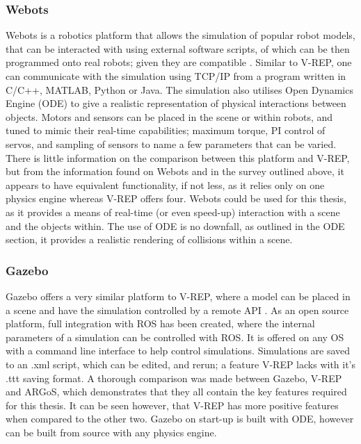 \documentclass[12pt,openany,a4paper]{book}
\begin{document}
\subsubsection{Webots}
Webots is a robotics platform that allows the simulation of popular robot models, that can be interacted with using external software scripts, of which can be then programmed onto real robots; given they are compatible \cite{webotsArticle}. Similar to V-REP, one can communicate with the simulation using TCP/IP from a program written in C/C++, MATLAB, Python or Java. The simulation also utilises Open Dynamics Engine (ODE) to give a realistic representation of physical interactions between objects. Motors and sensors can be placed in the scene or within robots, and tuned to mimic their real-time capabilities; maximum torque, PI control of servos, and sampling of sensors to name a few parameters that can be varied. There is little information on the comparison between this platform and V-REP, but from the information found on Webots and in the survey outlined above, it appears to have equivalent functionality, if not less, as it relies only on one physics engine whereas V-REP offers four.
Webots could be used for this thesis, as it provides a means of real-time (or even speed-up) interaction with a scene and the objects within. The use of ODE is no downfall, as outlined in the ODE section, it provides a realistic rendering of collisions within a scene.

\subsubsection{Gazebo}
Gazebo offers a very similar platform to V-REP, where a model can be placed in a scene and have the simulation controlled by a remote API \cite{comparisonVREP}. As an open source platform, full integration with ROS has been created, where the internal parameters of a simulation can be controlled with ROS. It is offered on any OS with a command line interface to help control simulations. Simulations are saved to an .xml script, which can be edited, and rerun; a feature V-REP lacks with it's .ttt saving format. A thorough comparison was made between Gazebo, V-REP and ARGoS, which demonstrates that they all contain the key features required for this thesis. It can be seen however, that V-REP has more positive features when compared to the other two. Gazebo on start-up is built with ODE, however can be built from source with any physics engine.
\end{document}
